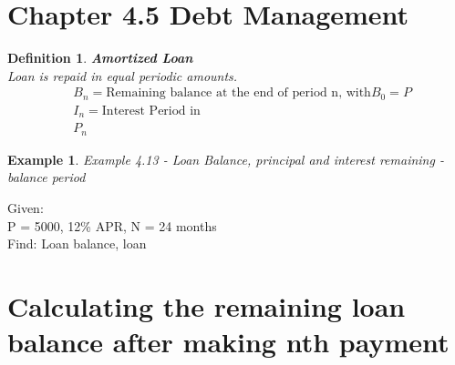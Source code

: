 \documentclass{report} %
\newtheorem{exmp}{Example}
\newtheorem{defn}{Definition}
\begin{document}
\section*{Chapter 4.5 Debt Management}
\begin{defn}
    \textbf{Amortized Loan} \\
    Loan is repaid in equal periodic amounts. \\
    \begin{equation*}
        \begin{aligned}
            &B_n = \text{Remaining balance at the end of period n, with} B_0 = P\\
            &I_n = \text{Interest Period in }\\
            &P_n 
        \end{aligned}
    \end{equation*}
\end{defn}

\begin{exmp}
    Example 4.13 - Loan Balance, principal and interest remaining - balance period  
\end{exmp}
\begin{center}
    Given: \\
    P = 5000, 12\% APR, N = 24 months \\
    Find: Loan balance, loan 
\end{center} %
\section*{Calculating the remaining loan balance after making nth payment}
\end{document}
